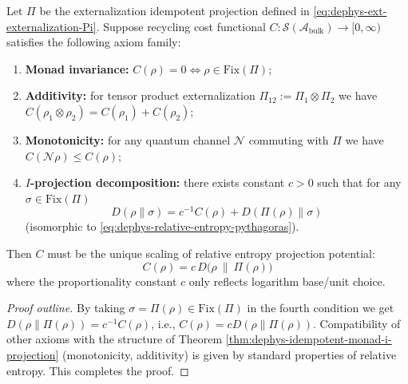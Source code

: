 \begin{proposition}\label{prop:dephys-idempotent-monad-entropy-axiomatic-uniqueness}
Let \(\Pi\) be the externalization idempotent projection defined in \eqref{eq:dephys-ext-externalization-Pi}.
Suppose recycling cost functional \(C:\mathcal{S}(\mathcal{A}_{\mathrm{bulk}})\to[0,\infty)\) satisfies the following axiom family:
\begin{enumerate}
  \item \textbf{Monad invariance:} \(C(\rho)=0\iff \rho\in\mathrm{Fix}(\Pi)\);
  \item \textbf{Additivity:} for tensor product externalization \(\Pi_{12}:=\Pi_1\otimes\Pi_2\) we have \(C(\rho_1\otimes\rho_2)=C(\rho_1)+C(\rho_2)\);
  \item \textbf{Monotonicity:} for any quantum channel \(\mathcal{N}\) commuting with \(\Pi\) we have \(C(\mathcal{N}\rho)\le C(\rho)\);
  \item \textbf{\(I\)-projection decomposition:} there exists constant \(c>0\) such that for any \(\sigma\in\mathrm{Fix}(\Pi)\)
  \[
  \boxed{\;
  D(\rho\|\sigma)=c^{-1}C(\rho)+D(\Pi(\rho)\|\sigma)\;}
  \]
  (isomorphic to \eqref{eq:dephys-relative-entropy-pythagoras}).
\end{enumerate}
Then \(C\) must be the unique scaling of relative entropy projection potential:
\[
\boxed{\;
C(\rho)=c\,D\bigl(\rho\ \|\ \Pi(\rho)\bigr)\;}
\]
where the proportionality constant \(c\) only reflects logarithm base/unit choice.
\end{proposition}
\begin{proof}[Proof outline]
By taking \(\sigma=\Pi(\rho)\in\mathrm{Fix}(\Pi)\) in the fourth condition we get
\(
D(\rho\|\Pi(\rho))=c^{-1}C(\rho)
\), i.e., \(C(\rho)=cD(\rho\|\Pi(\rho))\).
Compatibility of other axioms with the structure of Theorem \ref{thm:dephys-idempotent-monad-i-projection} (monotonicity, additivity) is given by standard properties of relative entropy. This completes the proof.
\end{proof}

